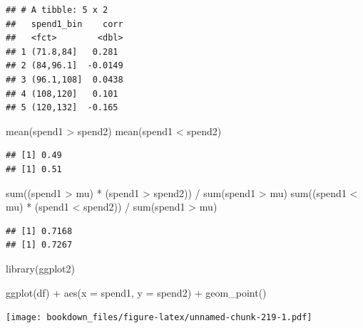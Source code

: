 \documentclass[
]{krantz}
\makeatletter
\newenvironment{Shaded}{\begin{snugshade}}{\end{snugshade}}
\newcommand{\AttributeTok}[1]{\textcolor[rgb]{0.61,0.61,0.61}{#1}}
\newcommand{\FunctionTok}[1]{\textcolor[rgb]{0,0,0}{#1}}
\newcommand{\NormalTok}[1]{#1}
\newcommand{\SpecialCharTok}[1]{\textcolor[rgb]{0,0,0}{#1}}
\newenvironment{kframe}{%
\medskip{}
\setlength{\fboxsep}{.8em}
 \def\at@end@of@kframe{}%
 \ifinner\ifhmode%
  \def\at@end@of@kframe{\end{minipage}}%
  \begin{minipage}{\columnwidth}%
 \fi\fi%
 \def\FrameCommand##1{\hskip\@totalleftmargin \hskip-\fboxsep
 \colorbox{shadecolor}{##1}\hskip-\fboxsep
     \hskip-\linewidth \hskip-\@totalleftmargin \hskip\columnwidth}%
 \MakeFramed {\advance\hsize-\width
   \@totalleftmargin\z@ \linewidth\hsize
   \@setminipage}}%
 {\par\unskip\endMakeFramed%
 \at@end@of@kframe}
\renewenvironment{Shaded}{\begin{kframe}}{\end{kframe}}
\makeatother
\begin{document}
\begin{verbatim}
## # A tibble: 5 x 2
##   spend1_bin    corr
##   <fct>        <dbl>
## 1 (71.8,84]   0.281 
## 2 (84,96.1]  -0.0149
## 3 (96.1,108]  0.0438
## 4 (108,120]   0.101 
## 5 (120,132]  -0.165
\end{verbatim}

\begin{Shaded}
\begin{Highlighting}[]
\FunctionTok{mean}\NormalTok{(spend1 }\SpecialCharTok{\textgreater{}}\NormalTok{ spend2)}
\FunctionTok{mean}\NormalTok{(spend1 }\SpecialCharTok{\textless{}}\NormalTok{ spend2)}
\end{Highlighting}
\end{Shaded}

\begin{verbatim}
## [1] 0.49
## [1] 0.51
\end{verbatim}

\begin{Shaded}
\begin{Highlighting}[]
\FunctionTok{sum}\NormalTok{((spend1 }\SpecialCharTok{\textgreater{}}\NormalTok{ mu) }\SpecialCharTok{*}\NormalTok{ (spend1 }\SpecialCharTok{\textgreater{}}\NormalTok{ spend2)) }\SpecialCharTok{/} \FunctionTok{sum}\NormalTok{(spend1 }\SpecialCharTok{\textgreater{}}\NormalTok{ mu)}
\FunctionTok{sum}\NormalTok{((spend1 }\SpecialCharTok{\textless{}}\NormalTok{ mu) }\SpecialCharTok{*}\NormalTok{ (spend1 }\SpecialCharTok{\textless{}}\NormalTok{ spend2)) }\SpecialCharTok{/} \FunctionTok{sum}\NormalTok{(spend1 }\SpecialCharTok{\textgreater{}}\NormalTok{ mu)}
\end{Highlighting}
\end{Shaded}

\begin{verbatim}
## [1] 0.7168
## [1] 0.7267
\end{verbatim}

\begin{Shaded}
\begin{Highlighting}[]
\FunctionTok{library}\NormalTok{(ggplot2)}

\FunctionTok{ggplot}\NormalTok{(df) }\SpecialCharTok{+}
  \FunctionTok{aes}\NormalTok{(}\AttributeTok{x =}\NormalTok{ spend1, }\AttributeTok{y =}\NormalTok{ spend2) }\SpecialCharTok{+} 
  \FunctionTok{geom\_point}\NormalTok{()}
\end{Highlighting}
\end{Shaded}

\texttt{[image: bookdown\_files/figure-latex/unnamed-chunk-219-1.pdf]}
\end{document}
